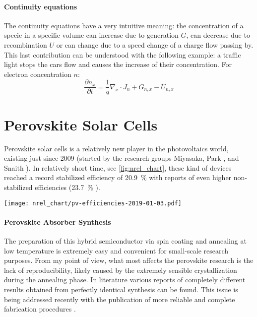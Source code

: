 	\paragraph{Continuity equations} The continuity equations have a very intuitive meaning: the concentration of a specie in a specific volume can increase due to generation $G$, can decrease due to recombination $U$ or can change due to a speed change of a charge flow passing by. This last contribution can be understood with the following example: a traffic light stops the cars flow and causes the increase of their concentration. For electron concentration $n$:	
$$\frac{\partial n_x}{\partial t} = \frac{1}{q}\nabla_x \cdot J_n + G_{n,x} - U_{n,x}$$

\section{Perovskite Solar Cells}

	Perovskite solar cells is a relatively new player in the photovoltaics world, existing just since 2009 (started by the research groups Miyasaka\cite{Kojima2009}, Park \cite{Im2011a,Kim2012b}, and Snaith \cite{Lee2012}). In relatively short time, see \cref{fig:nrel_chart}, these kind of devices reached a record stabilized efficiency of 20.9~\% \cite{Green2019} with reports of even higher non-stabilized efficiencies (23.7~\% \cite{Green2019,Jiang2017}).


	\begin{SCfigure}
		\centering
		\texttt{[image: nrel\_chart/pv-efficiencies-2019-01-03.pdf]}
		\label{fig:nrel_chart}
	\end{SCfigure}


	\paragraph{Perovskite Absorber Synthesis}

	The preparation of this hybrid semiconductor via spin coating and annealing at low temperature is extremely easy and convenient for small-scale research purposes. From my point of view, what most affects the perovskite research is the lack of reproducibility, likely caused by the extremely sensible crystallization during the annealing phase. In literature various reports of completely different results obtained from perfectly identical synthesis can be found\cite{Pockett2015,Gottesman2014}. This issue is being addressed recently with the publication of more reliable and complete fabrication procedures \cite{Saliba2018}.

